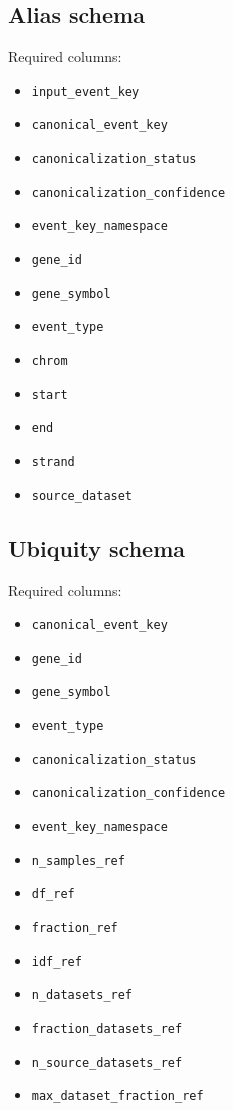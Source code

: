 \documentclass[11pt]{article}
\begin{document}
\subsection{Alias schema}
Required columns:
\begin{itemize}[leftmargin=2em]
\item \texttt{input\_event\_key}
\item \texttt{canonical\_event\_key}
\item \texttt{canonicalization\_status}
\item \texttt{canonicalization\_confidence}
\item \texttt{event\_key\_namespace}
\item \texttt{gene\_id}
\item \texttt{gene\_symbol}
\item \texttt{event\_type}
\item \texttt{chrom}
\item \texttt{start}
\item \texttt{end}
\item \texttt{strand}
\item \texttt{source\_dataset}
\end{itemize}

\subsection{Ubiquity schema}
Required columns:
\begin{itemize}[leftmargin=2em]
\item \texttt{canonical\_event\_key}
\item \texttt{gene\_id}
\item \texttt{gene\_symbol}
\item \texttt{event\_type}
\item \texttt{canonicalization\_status}
\item \texttt{canonicalization\_confidence}
\item \texttt{event\_key\_namespace}
\item \texttt{n\_samples\_ref}
\item \texttt{df\_ref}
\item \texttt{fraction\_ref}
\item \texttt{idf\_ref}
\item \texttt{n\_datasets\_ref}
\item \texttt{fraction\_datasets\_ref}
\item \texttt{n\_source\_datasets\_ref}
\item \texttt{max\_dataset\_fraction\_ref}
\end{itemize}
\end{document}
